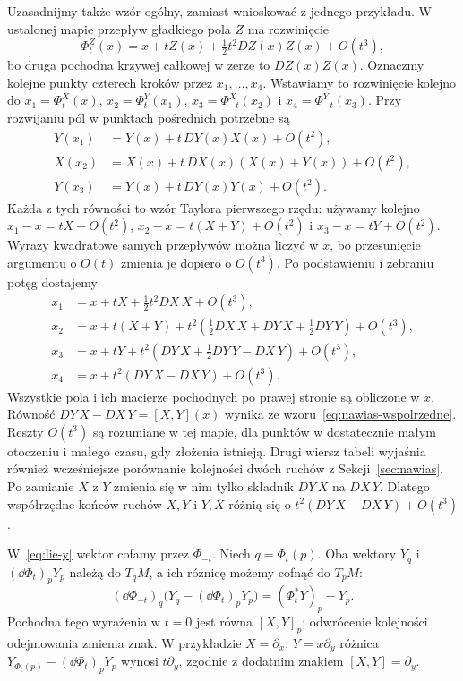 Uzasadnijmy także wzór ogólny, zamiast wnioskować z jednego przykładu.
W ustalonej mapie przepływ gładkiego pola $Z$ ma rozwinięcie
\[
 \Phi_t^Z(x)=x+tZ(x)+\tfrac12t^2 DZ(x)Z(x)+O(t^3),
\]
bo druga pochodna krzywej całkowej w zerze to $DZ(x)Z(x)$.
Oznaczmy kolejne punkty czterech kroków przez $x_1,\ldots,x_4$.
Wstawiamy to rozwinięcie kolejno do
$x_1=\Phi_t^X(x)$, $x_2=\Phi_t^Y(x_1)$,
$x_3=\Phi_{-t}^X(x_2)$ i $x_4=\Phi_{-t}^Y(x_3)$.
Przy rozwijaniu pól w punktach pośrednich potrzebne są
\[
 \begin{aligned}
 Y(x_1)&=Y(x)+t\,DY(x)X(x)+O(t^2),\\
 X(x_2)&=X(x)+t\,DX(x)(X(x)+Y(x))+O(t^2),\\
 Y(x_3)&=Y(x)+t\,DY(x)Y(x)+O(t^2).
 \end{aligned}
\]
Każda z tych równości to wzór Taylora pierwszego rzędu:
używamy kolejno $x_1-x=tX+O(t^2)$,
$x_2-x=t(X+Y)+O(t^2)$ i $x_3-x=tY+O(t^2)$.
Wyrazy kwadratowe samych przepływów można liczyć w $x$,
bo przesunięcie argumentu o $O(t)$ zmienia je dopiero o $O(t^3)$.
Po podstawieniu i zebraniu potęg dostajemy
\begin{align*}
 x_1&=x+tX+\tfrac12t^2 DX\,X+O(t^3),\\
 x_2&=x+t(X+Y)+t^2(\tfrac12 DX\,X+DY\,X+\tfrac12 DY\,Y)+O(t^3),\\
 x_3&=x+tY+t^2(DY\,X+\tfrac12 DY\,Y-DX\,Y)+O(t^3),\\
 x_4&=x+t^2(DY\,X-DX\,Y)+O(t^3).
\end{align*}
Wszystkie pola i ich macierze pochodnych po prawej stronie
są obliczone w $x$. Równość $DY\,X-DX\,Y=[X,Y](x)$
wynika ze wzoru~\eqref{eq:nawias-wspolrzedne}.
Reszty $O(t^3)$ są rozumiane w tej mapie, dla punktów w
dostatecznie małym otoczeniu i małego czasu, gdy złożenia istnieją.
Drugi wiersz tabeli wyjaśnia również wcześniejsze porównanie
kolejności dwóch ruchów z Sekcji~\ref{sec:nawias}.
Po zamianie $X$ z $Y$ zmienia się w nim tylko składnik
$DY\,X$ na $DX\,Y$. Dlatego współrzędne końców ruchów
$X,Y$ i $Y,X$ różnią się o $t^2(DY\,X-DX\,Y)+O(t^3)$.


\begin{uwaga}
W~\eqref{eq:lie-y} wektor cofamy przez $\Phi_{-t}$.
Niech $q=\Phi_t(p)$. Oba wektory $Y_q$ i
$(\dd\Phi_t)_pY_p$ należą do $T_qM$, a ich różnicę
możemy cofnąć do $T_pM$:
\[
(\dd\Phi_{-t})_q\bigl(Y_q-(\dd\Phi_t)_pY_p\bigr)
=(\Phi_t^*Y)_p-Y_p.
\]
Pochodna tego wyrażenia w $t=0$ jest równa
$[X,Y]_p$; odwrócenie kolejności odejmowania zmienia znak.
W przykładzie $X=\partial_x$, $Y=x\partial_y$ różnica
$Y_{\Phi_t(p)}-(\dd\Phi_t)_pY_p$ wynosi $t\partial_y$,
zgodnie z dodatnim znakiem $[X,Y]=\partial_y$.
\end{uwaga}

